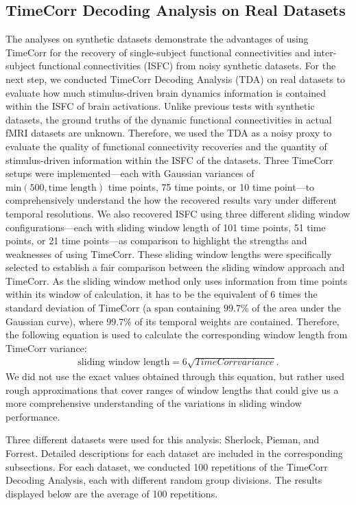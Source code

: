 \documentclass[11pt]{article}
\begin{document}
\subsection{TimeCorr Decoding Analysis on Real Datasets}
The analyses on synthetic datasets demonstrate the advantages of using TimeCorr for the recovery of single-subject functional connectivities and inter-subject functional connectivities (ISFC) from noisy synthetic datasets. For the next step, we conducted TimeCorr Decoding Analysis (TDA) on real datasets to evaluate how much stimulus-driven brain dynamics information is contained within the ISFC of brain activations. Unlike previous tests with synthetic datasets, the ground truths of the dynamic functional connectivities in actual fMRI datasets are unknown. Therefore, we used the TDA as a noisy proxy to evaluate the quality of functional connectivity recoveries and the quantity of stimulus-driven information within the ISFC of the datasets. Three TimeCorr setups were implemented---each with Gaussian variances of $\text{min}(500,\text{time length})$ time points, 75 time points, or 10 time point---to comprehensively understand the how the recovered results vary under different temporal resolutions. We also recovered ISFC using three different sliding window configurations---each with sliding window length of 101 time points, 51 time points, or 21 time points---as comparison to highlight the strengths and weaknesses of using TimeCorr. These sliding window lengths were specifically selected to establish a fair comparison between the sliding window approach and TimeCorr. As the sliding window method only uses information from time points within its window of calculation, it has to be the equivalent of 6 times the standard deviation of TimeCorr (a span containing $99.7\%$ of the area under the Gaussian curve), where $99.7\%$ of its temporal weights are contained. Therefore, the following equation is used to calculate the corresponding window length from TimeCorr variance:
\begin{align*}
\text{sliding window length} = 6\sqrt{TimeCorr variance}.
\end{align*}
We did not use the exact values obtained through this equation, but rather used rough approximations that cover ranges of window lengths that could give us a more comprehensive understanding of the variations in sliding window performance.


Three different datasets were used for this analysis: Sherlock, Pieman, and Forrest. Detailed descriptions for each dataset are included in the corresponding subsections. For each dataset, we conducted 100 repetitions of the TimeCorr Decoding Analysis, each with different random group divisions. The results displayed below are the average of 100 repetitions.
\end{document}
